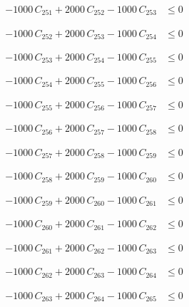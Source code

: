 \documentclass[a4paper,11pt]{article}
\begin{document}
\begin{align}
-1000\,C_{251} + 2000\,C_{252} - 1000\,C_{253} &\leq 0 \nonumber
\end{align}

\begin{align}
-1000\,C_{252} + 2000\,C_{253} - 1000\,C_{254} &\leq 0 \nonumber
\end{align}

\begin{align}
-1000\,C_{253} + 2000\,C_{254} - 1000\,C_{255} &\leq 0 \nonumber
\end{align}

\begin{align}
-1000\,C_{254} + 2000\,C_{255} - 1000\,C_{256} &\leq 0 \nonumber
\end{align}

\begin{align}
-1000\,C_{255} + 2000\,C_{256} - 1000\,C_{257} &\leq 0 \nonumber
\end{align}

\begin{align}
-1000\,C_{256} + 2000\,C_{257} - 1000\,C_{258} &\leq 0 \nonumber
\end{align}

\begin{align}
-1000\,C_{257} + 2000\,C_{258} - 1000\,C_{259} &\leq 0 \nonumber
\end{align}

\begin{align}
-1000\,C_{258} + 2000\,C_{259} - 1000\,C_{260} &\leq 0 \nonumber
\end{align}

\begin{align}
-1000\,C_{259} + 2000\,C_{260} - 1000\,C_{261} &\leq 0 \nonumber
\end{align}

\begin{align}
-1000\,C_{260} + 2000\,C_{261} - 1000\,C_{262} &\leq 0 \nonumber
\end{align}

\begin{align}
-1000\,C_{261} + 2000\,C_{262} - 1000\,C_{263} &\leq 0 \nonumber
\end{align}

\begin{align}
-1000\,C_{262} + 2000\,C_{263} - 1000\,C_{264} &\leq 0 \nonumber
\end{align}

\begin{align}
-1000\,C_{263} + 2000\,C_{264} - 1000\,C_{265} &\leq 0 \nonumber
\end{align}
\end{document}
